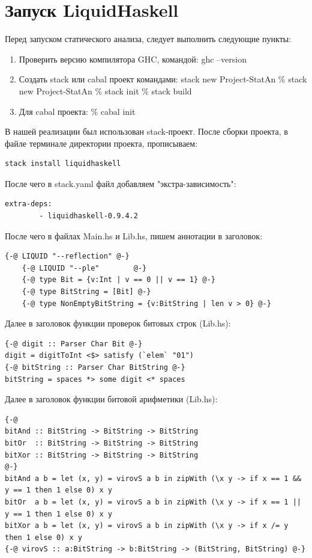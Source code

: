 \documentclass[areasetadvanced]{scrartcl}
\begin{document}
\section{Запуск LiquidHaskell}
Перед запуском статического анализа, следует выполнить следующие пункты:
\begin{enumerate}
    \item Проверить версию компилятора GHC, командой: ghc --version
    \item Создать stack или cabal проект командами: stack new Project-StatAn
    \subitem \% stack new Project-StatAn
    \subitem \% stack init 
    \subitem \% stack build 
    \item Для cabal проекта: 
    \subitem \% cabal init 
\end{enumerate}
В нашей реализации был использован stack-проект. 
После сборки проекта, в файле терминале директории проекта, прописываем:
\begin{lstlisting}[caption={stack}, label=lst:main]
    stack install liquidhaskell
\end{lstlisting}
После чего в stack.yaml файл добавляем "экстра-зависимость":
\begin{lstlisting}[caption={stack}, label=lst:main]
    extra-deps:
        - liquidhaskell-0.9.4.2
\end{lstlisting}
После чего в файлах Main.hs и Lib.hs, пишем аннотации в заголовок:
\begin{lstlisting}[caption={Аннотации}, label=lst:main]
    {-@ LIQUID "--reflection" @-}
    {-@ LIQUID "--ple"        @-}
    {-@ type Bit = {v:Int | v == 0 || v == 1} @-}
    {-@ type BitString = [Bit] @-}
    {-@ type NonEmptyBitString = {v:BitString | len v > 0} @-}
\end{lstlisting}
Далее в заголовок функции проверок битовых строк (Lib.hs):
\begin{lstlisting}[caption={Аннотации}, label=lst:main]
{-@ digit :: Parser Char Bit @-}
digit = digitToInt <$> satisfy (`elem` "01")
{-@ bitString :: Parser Char BitString @-}
bitString = spaces *> some digit <* spaces
\end{lstlisting}
Далее в заголовок функции битовой арифметики (Lib.hs):
\begin{lstlisting}[caption={Аннотации}, label=lst:main]
{-@
bitAnd :: BitString -> BitString -> BitString
bitOr  :: BitString -> BitString -> BitString
bitXor :: BitString -> BitString -> BitString
@-}
bitAnd a b = let (x, y) = virovS a b in zipWith (\x y -> if x == 1 && y == 1 then 1 else 0) x y
bitOr  a b = let (x, y) = virovS a b in zipWith (\x y -> if x == 1 || y == 1 then 1 else 0) x y
bitXor a b = let (x, y) = virovS a b in zipWith (\x y -> if x /= y then 1 else 0) x y
{-@ virovS :: a:BitString -> b:BitString -> (BitString, BitString) @-}
\end{lstlisting}
\end{document}
